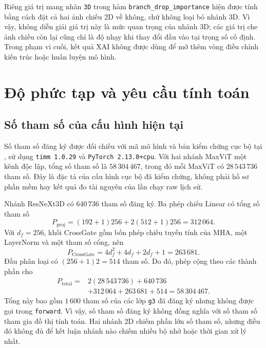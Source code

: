 \documentclass[14pt,a4paper,oneside]{extreport}
\begin{document}
Riêng giá trị mang nhãn \texttt{3D} trong hàm
\texttt{branch\_drop\_importance} hiện được tính bằng cách đặt cả hai
ảnh chiếu 2D về không, chứ không loại bỏ nhánh 3D. Vì vậy, không diễn
giải giá trị này là mức quan trọng của nhánh 3D; các giá trị che ảnh
chiếu còn lại cũng chỉ là độ nhạy khi thay đổi đầu vào tại trọng số
cố định. Trong phạm vi cuối, kết quả XAI không được dùng để mở thêm
vòng điều chỉnh kiến trúc hoặc huấn luyện mô hình.

\section{Độ phức tạp và yêu cầu tính toán}
\subsection{Số tham số của cấu hình hiện tại}
Số tham số đăng ký được đối chiếu với mã mô hình và bản kiểm chứng
cục bộ tại ,
sử dụng \texttt{timm 1.0.29} và \texttt{PyTorch 2.13.0+cpu}.
Với hai nhánh MaxViT một kênh độc lập, tổng số tham số là
$58\,304\,467$, trong đó mỗi MaxViT có $28\,543\,736$ tham số.
Đây là đặc tả của cấu hình cục bộ đã kiểm chứng, không phải hồ sơ
phần mềm hay kết quả đo tài nguyên của lần chạy raw lịch sử.

Nhánh ResNeXt3D có $640\,736$ tham số đăng ký. Ba phép chiếu
Linear có tổng số tham số
\begin{equation}
 P_{\mathrm{proj}}=(192+1)256+2(512+1)256=312\,064.
\end{equation}
Với $d_f=256$, khối CrossGate gồm bốn phép chiếu tuyến tính của
MHA, một LayerNorm và một tham số cổng, nên
\begin{equation}
 P_{\mathrm{CrossGate}}=4d_f^2+4d_f+2d_f+1=263\,681.
\end{equation}
Đầu phân loại có $(256+1)2=514$ tham số. Do đó, phép cộng theo
các thành phần cho
\begin{equation}
 \begin{split}
 P_{\mathrm{total}}={}&2(28\,543\,736)+640\,736\\
 &+312\,064+263\,681+514=58\,304\,467.
 \end{split}
\end{equation}
Tổng này bao gồm $1\,600$ tham số của các lớp \texttt{g3} đã đăng
ký nhưng không được gọi trong \texttt{forward}. Vì vậy, số tham số
đăng ký không đồng nghĩa với số tham số tham gia đồ thị tính toán.
Hai nhánh 2D chiếm phần lớn số tham số, nhưng điều đó không đủ để
kết luận nhánh nào chiếm nhiều bộ nhớ hoặc thời gian xử lý nhất.
\end{document}
